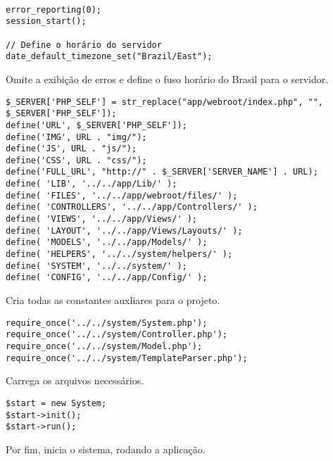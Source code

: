 \begin{lstlisting}

error_reporting(0);
session_start();

// Define o horário do servidor
date_default_timezone_set("Brazil/East");

\end{lstlisting}

            Omite a exibição de erros e define o fuso horário do Brasil para o servidor.

\begin{lstlisting}
$_SERVER['PHP_SELF'] = str_replace("app/webroot/index.php", "", $_SERVER['PHP_SELF']);
define('URL', $_SERVER['PHP_SELF']);
define('IMG', URL . "img/");
define('JS', URL . "js/");
define('CSS', URL . "css/");
define('FULL_URL', "http://" . $_SERVER['SERVER_NAME'] . URL);
define( 'LIB', '../../app/Lib/' );
define( 'FILES', '../../app/webroot/files/' );
define( 'CONTROLLERS', '../../app/Controllers/' );
define( 'VIEWS', '../../app/Views/' );
define( 'LAYOUT', '../../app/Views/Layouts/' );
define( 'MODELS', '../../app/Models/' );
define( 'HELPERS', '../../system/helpers/' );
define( 'SYSTEM', '../../system/' );
define( 'CONFIG', '../../app/Config/' );
\end{lstlisting}

            Cria todas as constantes auxliares para o projeto.

\begin{lstlisting}
require_once('../../system/System.php');
require_once('../../system/Controller.php');
require_once('../../system/Model.php');
require_once('../../system/TemplateParser.php');
\end{lstlisting}

            Carrega os arquivos necessários.

\begin{lstlisting}
$start = new System;
$start->init();
$start->run();
\end{lstlisting}

            Por fim, inicia o sistema, rodando a aplicação.




